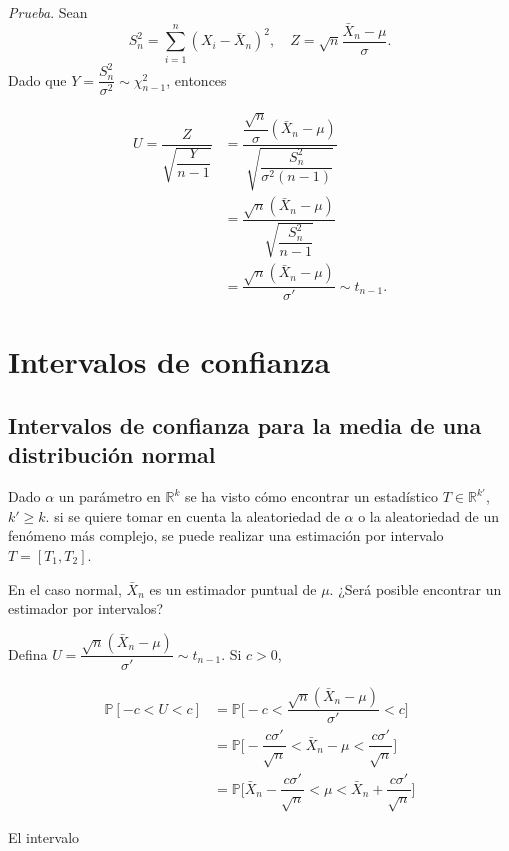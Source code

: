 \documentclass[
  12pt,
]{book}
\begin{document}
\emph{Prueba}. Sean
\[S_n^2=\sum_{i=1}^n(X_i-\bar X_n)^2, \quad Z =  \sqrt n \dfrac{\bar X_n-\mu}{\sigma}. \]
Dado que \(Y = \dfrac{S_n^2}{\sigma^2}\sim \chi^2_{n-1}\), entonces

\begin{align*} 
U = \dfrac{Z}{\sqrt{\dfrac Y{n-1}}} & = \dfrac{\dfrac{\sqrt n}\sigma (\bar X_n-\mu)}{\sqrt{\dfrac{S_n^2}{\sigma^2(n-1)}}} \\ & = \dfrac{\sqrt n (\bar X_n-\mu)}{\sqrt{\dfrac{S_n^2}{n-1}}}\\& =  \dfrac{\sqrt n (\bar X_n-\mu)}{\sigma'} \sim t_{n-1}.
\end{align*}

\hypertarget{intervalos-de-confianza}{%
\chapter{Intervalos de confianza}\label{intervalos-de-confianza}}

\hypertarget{intervalos-de-confianza-para-la-media-de-una-distribuciuxf3n-normal}{%
\section{Intervalos de confianza para la media de una distribución normal}\label{intervalos-de-confianza-para-la-media-de-una-distribuciuxf3n-normal}}

Dado \(\alpha\) un parámetro en \(\mathbb{R}^k\) se ha visto cómo encontrar un estadístico \(T\in \mathbb R^{k'}\), \(k'\geq k\). si se quiere tomar en cuenta la aleatoriedad de \(\alpha\) o la aleatoriedad de un fenómeno más complejo, se puede realizar una estimación por intervalo \(T = [T_1,T_2]\).

En el caso normal, \(\bar X_n\) es un estimador puntual de \(\mu\). ¿Será posible encontrar un estimador por intervalos?

Defina \(U = \dfrac{\sqrt{n}(\bar X_n-\mu)}{\sigma'} \sim t_{n-1}\). Si \(c>0\),

\begin{align*} 
\mathbb P[-c<U<c] & = \mathbb P \bigg[ -c<\dfrac{\sqrt{n}(\bar
X_n-\mu)}{\sigma'} <c\bigg]\\ 
& = \mathbb P \bigg[-\dfrac{c\sigma'}{\sqrt n} <
\bar X_n - \mu <\dfrac{c\sigma'}{\sqrt n}\bigg] \\ 
& = \mathbb P \bigg[ \bar X_n
-\dfrac{c\sigma'}{\sqrt n} < \mu < \bar X_n + \dfrac{c\sigma'}{\sqrt n}\bigg]
\end{align*}

El intervalo
\end{document}
